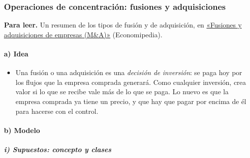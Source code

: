 \documentclass[11pt]{article}
\begin{document}
\subsubsection{Operaciones de concentración: fusiones y adquisiciones}\label{sec:fusiones}

\begin{anotaciones}
\textbf{Para leer.} Un resumen de los tipos de fusión y de adquisición, en \href{https://economipedia.com/definiciones/fusiones-y-adquisiciones-de-empresas-ma.html}{«Fusiones y adquisiciones de empresas (M\&A)»} (Economipedia).
\end{anotaciones}

\paragraph{a) Idea}

\begin{itemize}
\item Una fusión o una adquisición es una \emph{decisión de inversión}: se paga hoy por los flujos que la empresa comprada generará. Como cualquier inversión, crea valor si lo que se recibe vale más de lo que se paga. Lo nuevo es que la empresa comprada ya tiene un precio, y que hay que pagar por encima de él para hacerse con el control.
\end{itemize}

\paragraph{b) Modelo}

\subparagraph{i) Supuestos: concepto y clases}
\end{document}
